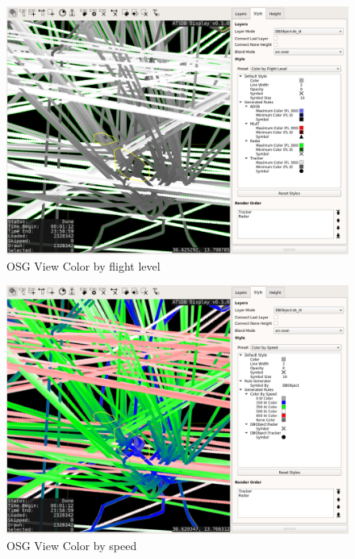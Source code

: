 \begin{figure}[H]
    \hspace*{-2.5cm}
    \includegraphics[width=19cm,frame]{../screenshots/osgview_style_flight_level.png}
  \caption{OSG View Color by flight level}
\end{figure}

\begin{figure}[H]
    \hspace*{-2.5cm}
    \includegraphics[width=19cm,frame]{../screenshots/osgview_style_speed.png}
  \caption{OSG View Color by speed}
\end{figure}

